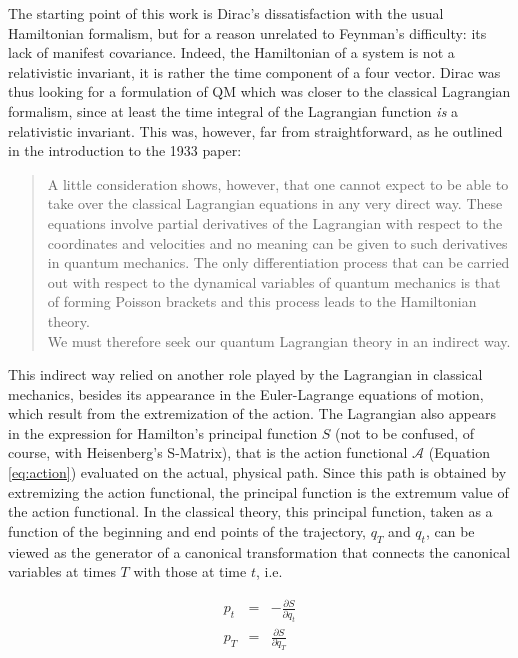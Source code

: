 \documentclass[12pt]{article}
\begin{document}
The starting point of this work is Dirac's dissatisfaction with the usual Hamiltonian formalism, but for a reason unrelated to Feynman's difficulty: its lack of manifest covariance. Indeed, the Hamiltonian of a system is not a relativistic invariant, it is rather the time component of a four vector. Dirac was thus looking for a formulation of QM which was closer to the classical Lagrangian formalism, since at least the time integral of the Lagrangian function \emph{is} a relativistic invariant. This was, however, far from straightforward, as he outlined in the introduction to the 1933 paper:

\begin{quote}
A little consideration shows, however, that one cannot expect to be able to take over the classical Lagrangian equations in any very direct way. These equations involve partial derivatives of the Lagrangian with respect to the coordinates and velocities and no meaning can be given to such derivatives in quantum mechanics. The only differentiation process that can be carried out with respect to the dynamical variables of quantum mechanics is that of forming Poisson brackets and this process leads to the Hamiltonian theory.\\
We must therefore seek our quantum Lagrangian theory in an indirect way.
\end{quote}

This indirect way relied on another role played by the Lagrangian in classical mechanics, besides its appearance in the Euler-Lagrange equations of motion, which result from the extremization of the action. The Lagrangian also appears in the expression for Hamilton's principal function $S$ (not to be confused, of course, with Heisenberg's S-Matrix), that is the action functional $\mathcal{A}$ (Equation \ref{eq:action}) evaluated on the actual, physical path. Since this path is obtained by extremizing the action functional, the principal function is the extremum value of the action functional. In the classical theory, this principal function, taken as a function of the beginning and end points of the trajectory, $q_T$ and $q_t$, can be viewed as the generator of a canonical transformation that connects the canonical variables at times $T$ with those at time $t$, i.e.

\begin{eqnarray}\label{eq:canonical}
p_t & = & - \frac{\partial S}{\partial q_t} \nonumber\\
p_T & = & \frac{\partial S}{\partial q_T}
\end{eqnarray}
\end{document}
